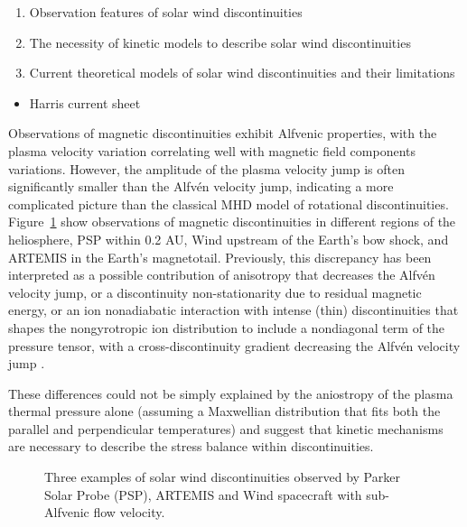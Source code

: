 \documentclass[
  letterpaper,
  DIV=11,
  numbers=noendperiod]{scrartcl}
\providecommand{\tightlist}{%
  \setlength{\itemsep}{0pt}\setlength{\parskip}{0pt}}\usepackage{longtable,booktabs,array}
\begin{document}
\begin{enumerate}
\def\labelenumi{\arabic{enumi}.}
\tightlist
\item
  Observation features of solar wind discontinuities
\item
  The necessity of kinetic models to describe solar wind discontinuities
\item
  Current theoretical models of solar wind discontinuities and their limitations
\end{enumerate}

\begin{itemize}
\tightlist
\item
  Harris current sheet \citet{harrisPlasmaSheathSeparating1962}
\end{itemize}

Observations of magnetic discontinuities exhibit Alfvenic properties, with the plasma velocity variation correlating well with magnetic field components variations. However, the amplitude of the plasma velocity jump is often significantly smaller than the Alfvén velocity jump, indicating a more complicated picture than the classical MHD model of rotational discontinuities. Figure~\ref{fig-examples} show observations of magnetic discontinuities in different regions of the heliosphere, PSP within 0.2 AU, Wind upstream of the Earth's bow shock, and ARTEMIS in the Earth's magnetotail. Previously, this discrepancy has been interpreted as a possible contribution of anisotropy that decreases the Alfvén velocity jump, or a discontinuity non-stationarity due to residual magnetic energy, or an ion nonadiabatic interaction with intense (thin) discontinuities that shapes the nongyrotropic ion distribution to include a nondiagonal term of the pressure tensor, with a cross-discontinuity gradient decreasing the Alfvén velocity jump \citet{artemyevIonNongyrotropySolar2020}.

These differences could not be simply explained by the aniostropy of the plasma thermal pressure alone (assuming a Maxwellian distribution that fits both the parallel and perpendicular temperatures) and suggest that kinetic mechanisms are necessary to describe the stress balance within discontinuities.

\begin{figure}


\caption{\label{fig-examples}Three examples of solar wind discontinuities observed by Parker Solar Probe (PSP), ARTEMIS and Wind spacecraft with sub-Alfvenic flow velocity.}

\end{figure}%
\end{document}
